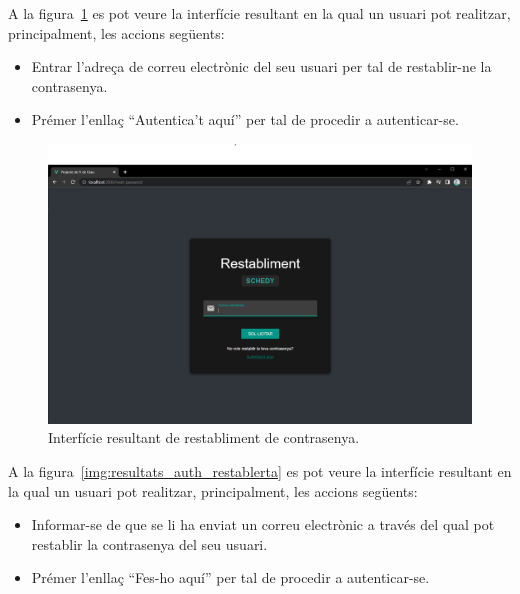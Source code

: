 \documentclass[a4paper,12pt]{ThesisStyle}
\begin{document}
\newpage

A la figura~\ref{img:resultats_auth_restabliment} es pot veure la interfície resultant en la qual un usuari pot realitzar, principalment, les accions següents:
\begin{itemize}
  \item Entrar l'adreça de correu electrònic del seu usuari per tal de restablir-ne la contrasenya.
  \item Prémer l'enllaç ``Autentica't aquí'' per tal de procedir a autenticar-se.
\end{itemize}

\begin{figure}[H]
  \centering
  \includegraphics[width=\textwidth]{assets/results/auth/restabliment.png}
  \caption{\label{img:resultats_auth_restabliment}Interfície resultant de restabliment de contrasenya.}
\end{figure}

\newpage

A la figura~\ref{img:resultats_auth_restablerta} es pot veure la interfície resultant en la qual un usuari pot realitzar, principalment, les accions següents:
\begin{itemize}
  \item Informar-se de que se li ha enviat un correu electrònic a través del qual pot restablir la contrasenya del seu usuari.
  \item Prémer l'enllaç ``Fes-ho aquí'' per tal de procedir a autenticar-se.
\end{itemize}
\end{document}
